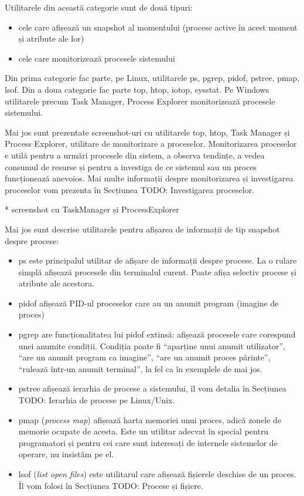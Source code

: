 Utilitarele din această categorie sunt de două tipuri:

\begin{itemize}
	\item cele care afișează un snapshot al momentului (procese active în
		acest moment și atribute ale lor)
	\item cele care monitorizează procesele sistemului
\end{itemize}

Din prima categorie fac parte, pe Linux, utilitarele ps, pgrep, pidof, pstree,
pmap, lsof. Din a doua categorie fac parte top, htop, iotop, sysstat. Pe Windows
utilitarele precum Task Manager, Process Explorer monitorizează procesele
sistemului.

Mai jos sunt prezentate screenshot-uri cu utilitarele top, htop, Task Manager și
Process Explorer, utilitare de monitorizare a proceselor. Monitorizarea
proceselor e utilă pentru a urmări procesele din sistem, a observa tendințe, a
vedea consumul de resurse și pentru a investiga de ce sistemul sau un proces
funcționează anevoios. Mai multe informații despre monitorizarea și investigarea
proceselor vom prezenta în Secțiunea TODO: Investigarea proceselor.

* screenshot cu TaskManager și ProcessExplorer

Mai jos sunt descrise utilitarele pentru afișarea de informații de tip snapshot
despre procese:

\begin{itemize}
	\item ps este principalul utilitar de afișare de informații despre
		procese. La o rulare simplă afișează procesele din terminalul
		curent. Poate afișa selectiv procese și atribute ale acestora.
	\item pidof afișează PID-ul proceselor care au un anumit program
		(imagine de proces)
	\item pgrep are funcționalitatea lui pidof extinsă: afișează procesele
		care corespund unei anumite condiții. Condiția poate fi
		“aparține unui anumit utilizator”, “are un anumit program ca
		imagine”, “are un anumit proces părinte”, “rulează într-un
		anumit terminal”, la fel ca în exemplele de mai jos.
	\item pstree afișează ierarhia de procese a sistemului, îl vom detalia
		în Secțiunea TODO: Ierarhia de procese pe Linux/Unix.
	\item pmap (\textit{process map}) afișează harta memoriei unui proces, adică
		zonele de memorie ocupate de acesta. Este un utilitar adecvat în
		special pentru programatori și pentru cei care sunt interesați
		de internele sistemelor de operare, nu insistăm pe el.
	\item lsof (\textit{list open files}) este utilitarul care afișează fișierele
		deschise de un proces. Îl vom folosi în Secțiunea TODO: Procese
		și fișiere.
\end{itemize}

